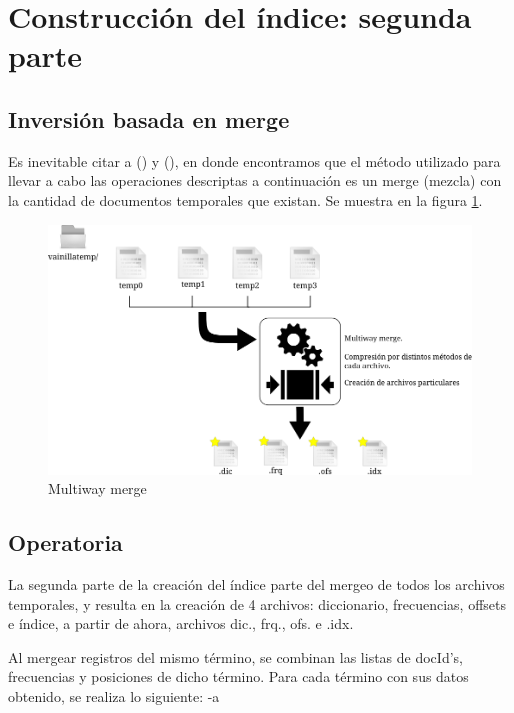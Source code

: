 \section{Construcción del índice: segunda parte}\label{sec:indice2}

\subsection{Inversión basada en merge}

Es inevitable citar a \citet[p. ~14]{Zobel06invertedfiles} (\citeyear{Zobel06invertedfiles}) y \citet[p.~238]{WittenMoffatBell99} (\citeyear{WittenMoffatBell99}), en donde encontramos que el método utilizado para llevar a cabo las operaciones descriptas a continuación es un merge (mezcla) con la cantidad de documentos temporales que existan. Se muestra en la figura \ref{fig:indice2_1}.

\begin{figure}[!ht]
\centering
    \includegraphics[scale=0.8]{./Images/indice2_1.png}
\caption{Multiway merge}
\label{fig:indice2_1}
\end{figure}


\subsection{Operatoria}

La segunda parte de la creación del índice parte del mergeo de todos los archivos temporales, y resulta en la creación de 4 archivos: diccionario, frecuencias, offsets e índice, a partir de ahora, archivos dic., frq., ofs. e .idx.

Al mergear registros del mismo término, se combinan las listas de docId's, frecuencias y posiciones de dicho término. Para cada término con sus datos obtenido, se realiza lo siguiente: -a

